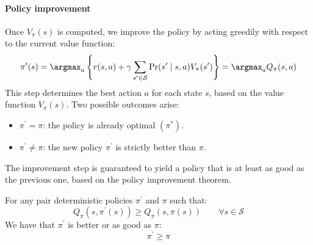 \paragraph*{Policy improvement}
Once $V_\pi(s)$ is computed, we improve the policy by acting greedily with respect to the current value function:
\[\pi^\prime(s)=\argmax_a\left\{r(s,a)+\gamma\sum_{s^\prime\in\mathcal{S}}\Pr(s^\prime\mid s,a)V_{\pi}(s^\prime)\right\}=\argmax_aQ_{\pi}(s,a)\]
This step determines the best action $a$ for each state $s$, based on the value function $V_\pi(s)$. 
Two possible outcomes arise:
\begin{itemize}
    \item $\pi^\prime=\pi$: the policy is already optimal $(\pi^\ast)$. 
    \item $\pi^\prime\neq\pi$: the new policy $\pi^\prime$ is strictly better than $\pi$. 
\end{itemize}
The improvement step is guaranteed to yield a policy that is at least as good as the previous one, based on the policy improvement theorem. 
\begin{theorem}
    For any pair deterministic policies $\pi^\prime$ and $\pi$ such that: 
    \[Q_\pi(s,\pi^\prime(s))\geq Q_{\pi}(s,\pi(s)) \qquad \forall s \in \mathcal{S}\]
    We have that $\pi^\prime$ is better or as good as $\pi$: 
    \[\pi^\prime\geq\pi\]
\end{theorem}

